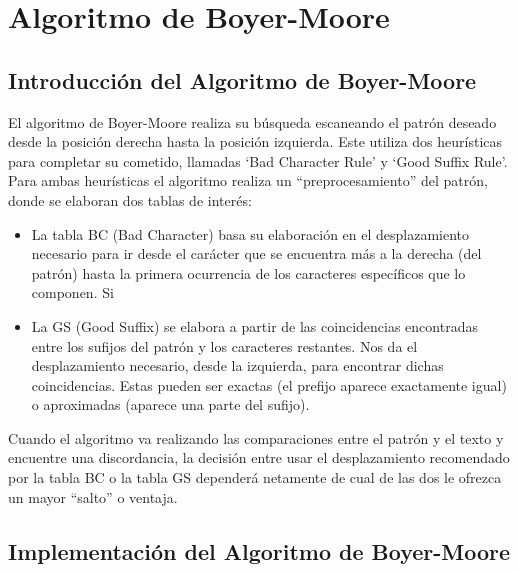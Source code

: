 
\section*{Algoritmo de Boyer-Moore}
{}

\subsection*{Introducción del Algoritmo de Boyer-Moore}

El algoritmo de Boyer-Moore realiza su búsqueda escaneando el patrón deseado desde la posición derecha hasta la posición izquierda. Este utiliza dos heurísticas para completar su cometido, llamadas ‘Bad Character Rule’ y ‘Good Suffix Rule’.
Para ambas heurísticas el algoritmo realiza un “preprocesamiento” del patrón, donde se elaboran dos tablas de interés:
\begin{itemize}
    \item La tabla BC (Bad Character) basa su elaboración en el desplazamiento necesario para ir desde el carácter que se encuentra más a la derecha (del patrón) hasta la primera ocurrencia de los caracteres específicos que lo componen. Si 
    \item La GS (Good Suffix) se elabora a partir de las coincidencias encontradas entre los sufijos del patrón y los caracteres restantes. Nos da el desplazamiento necesario, desde la izquierda, para encontrar dichas coincidencias. Estas pueden ser exactas (el prefijo aparece exactamente igual) o aproximadas (aparece una parte del sufijo).
\end{itemize}

Cuando el algoritmo va realizando las comparaciones entre el patrón y el texto y encuentre una discordancia, la decisión entre usar el desplazamiento recomendado por la tabla BC o la tabla GS dependerá netamente de cual de las dos le ofrezca un mayor “salto” o ventaja.

\subsection*{Implementación del Algoritmo de Boyer-Moore}

